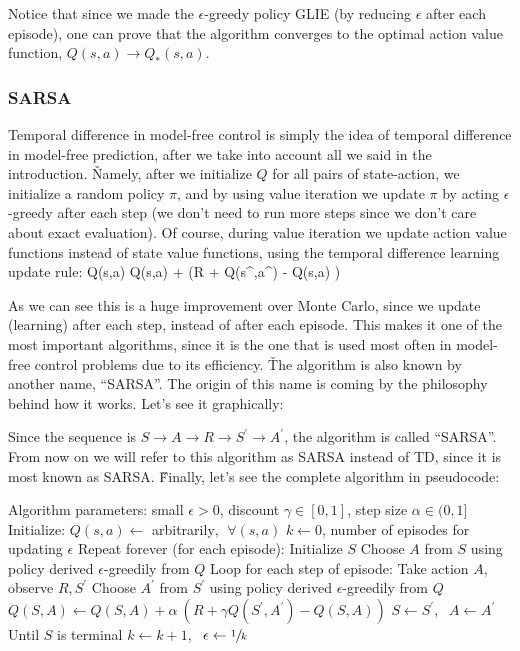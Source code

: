 Notice that since we made the $\epsilon$-greedy policy GLIE (by reducing $\epsilon$ after each episode), one can
prove that the algorithm converges to the optimal action value function, $Q(s,a) \to Q_{*}(s,a)$.

\subsubsection{SARSA}

Temporal difference in model-free control is simply the idea of temporal difference in model-free prediction, after
we take into account all we said in the introduction. \v

Namely, after we initialize $Q$ for all pairs of state-action, we initialize a random policy $\pi$, and by using
value iteration we update $\pi$ by acting $\epsilon$-greedy after each step (we don't need to run more steps since
we don't care about exact evaluation). Of course, during value iteration we update action value functions instead of
state value functions, using the temporal difference learning update rule:
\bse
Q(s,a) \gets Q(s,a) + \alpha \left(R + \gamma Q(s^\prime,a^\prime) - Q(s,a) \right)
\ese

As we can see this is a huge improvement over Monte Carlo, since we update (learning) after each step, instead of
after each episode. This makes it one of the most important algorithms, since it is the one that is used most often in
model-free control problems due to its efficiency. \v

The algorithm is also known by another name, ``SARSA''. The origin of this name is coming by the philosophy behind
how it works. Let's see it graphically:


Since the sequence is $S \to A \to R \to S^\prime \to A^\prime$, the algorithm is called ``SARSA''. From now on we
will refer to this algorithm as SARSA instead of TD, since it is most known as SARSA. \v

Finally, let's see the complete algorithm in pseudocode:

\begin{block}
Algorithm parameters: small $\epsilon > 0$, discount $\gamma \in [0,1]$, step size $\alpha \in (0,1]$
Initialize:
    $Q(s,a) \gets$ arbitrarily$, \:\: \forall (s,a)$
    $k \gets 0$, number of episodes for updating $\epsilon$
Repeat forever (for each episode):
    Initialize $S$
    Choose $A$ from $S$ using policy derived $\epsilon$-greedily from $Q$
    Loop for each step of episode:
        Take action $A$, observe $R, S^\prime$
        Choose $A^\prime$ from $S^\prime$ using policy derived $\epsilon$-greedily from $Q$
        $Q(S,A) \gets Q(S,A) + \alpha \: (R + \gamma Q(S^\prime, A^\prime) - Q(S,A))$
        $S \gets S^\prime$, $\:\: A \gets A^\prime$
    Until $S$ is terminal
    $k \gets k+1$, $\:\: \epsilon \gets \sfrac{1}{k}$
\end{block}

